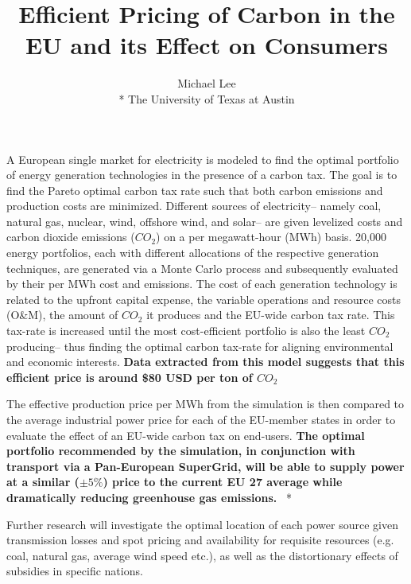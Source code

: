 \documentclass{article}
\title{Efficient Pricing of Carbon in the EU and its Effect on Consumers}
\author{Michael Lee \\*
The University of Texas at Austin}
\begin{document}
\maketitle{}
\onehalfspacing

A European single market for electricity is modeled to find the optimal portfolio of energy generation technologies in the presence of a carbon tax. The goal is to find the Pareto optimal carbon tax rate such that both carbon emissions and production costs are minimized. Different sources of electricity-- namely coal, natural gas, nuclear, wind, offshore wind, and solar-- are given levelized costs and carbon dioxide emissions ($CO_{2}$) on a per megawatt-hour (MWh) basis. 20,000 energy portfolios, each with different allocations of the respective generation techniques, are generated via a Monte Carlo process and subsequently evaluated by their per MWh cost and emissions. The cost of each generation technology is related to the upfront capital expense, the variable operations and resource costs (O\&M), the amount of $CO_{2}$ it produces and the EU-wide carbon tax rate. This tax-rate is increased until the most cost-efficient portfolio is also the least $CO_{2}$ producing-- thus finding the optimal carbon tax-rate for aligning environmental and economic interests. {\bf Data extracted from this model suggests that this efficient price is around \$80 USD per ton of $CO_{2}$}\*

The effective production price per MWh from the simulation is then compared to the average industrial power price for each of the EU-member states in order to evaluate the effect of an EU-wide carbon tax on end-users. {\bf The optimal portfolio recommended by the simulation, in conjunction with transport via a Pan-European SuperGrid, will be able to supply power at a similar ($\pm 5\%$) price to the current EU 27 average while dramatically reducing greenhouse gas emissions.}  \
*


Further research will investigate the optimal location of each power source given transmission losses and spot pricing and availability for requisite resources (e.g. coal, natural gas, average wind speed etc.), as well as the distortionary effects of subsidies in specific nations.
\end{document}
